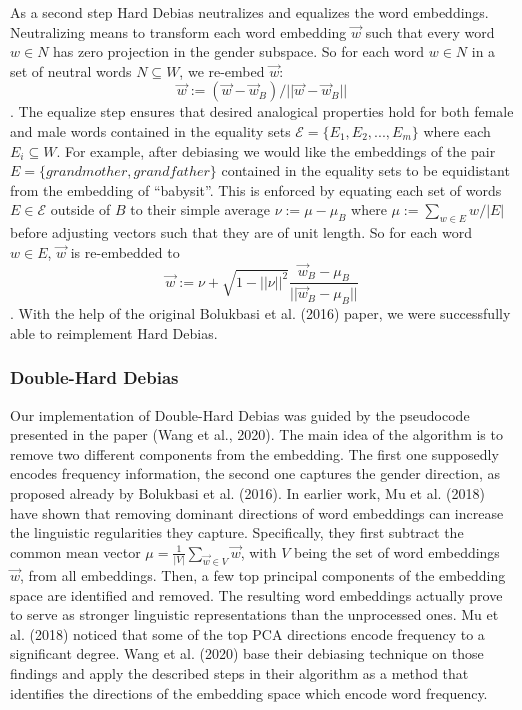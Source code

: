 \documentclass[
  english,
  man,floatsintext]{apa6}
\begin{document}
As a second step Hard Debias neutralizes and equalizes the word embeddings. Neutralizing means to transform each word embedding \(\vec{w}\) such that every word \(w\in N\) has zero projection in the gender subspace. So for each word \(w\in N\) in a set of neutral words \(N \subseteq W\), we re-embed \(\vec{w}\): \[\vec{w}:=(\vec{w}-\vec{w}_B)/||\vec{w}-\vec{w}_B||\]. The equalize step ensures that desired analogical properties hold for both female and male words contained in the equality sets \(\mathcal{E}=\{E_1,E_2,...,E_m\}\) where each \(E_i \subseteq W\). For example, after debiasing we would like the embeddings of the pair \(E=\{grandmother, grandfather\}\) contained in the equality sets to be equidistant from the embedding of \enquote{babysit}. This is enforced by equating each set of words \(E\in \mathcal{E}\) outside of \(B\) to their simple average \(\nu:=\mu-\mu_B\) where \(\mu:=\sum_{w\in E}w/|E|\) before adjusting vectors such that they are of unit length. So for each word \(w\in E\), \(\vec{w}\) is re-embedded to \[\vec{w}:=\nu+\sqrt{1-||\nu||^2}\frac{\vec{w}_B-\mu_B}{||\vec{w}_B-\mu_B||}\].
With the help of the original Bolukbasi et al. (2016) paper, we were successfully able to reimplement Hard Debias.

\hypertarget{double-hard-debias}{%
\subsubsection{Double-Hard Debias}\label{double-hard-debias}}

Our implementation of Double-Hard Debias was guided by the pseudocode presented in the paper (Wang et al., 2020).
The main idea of the algorithm is to remove two different components from the embedding. The first one supposedly encodes frequency information, the second one captures the gender direction, as proposed already by Bolukbasi et al. (2016).
In earlier work, Mu et al. (2018) have shown that removing dominant directions of word embeddings can increase the linguistic regularities they capture. Specifically, they first subtract the common mean vector \(\mu = \frac{1}{|V|}\sum_{\vec{w} \in V}\vec{w}\), with \(V\) being the set of word embeddings \(\vec{w}\), from all embeddings. Then, a few top principal components of the embedding space are identified and removed. The resulting word embeddings actually prove to serve as stronger linguistic representations than the unprocessed ones. Mu et al. (2018) noticed that some of the top PCA directions encode frequency to a significant degree. Wang et al. (2020) base their debiasing technique on those findings and apply the described steps in their algorithm as a method that identifies the directions of the embedding space which encode word frequency.
\end{document}
